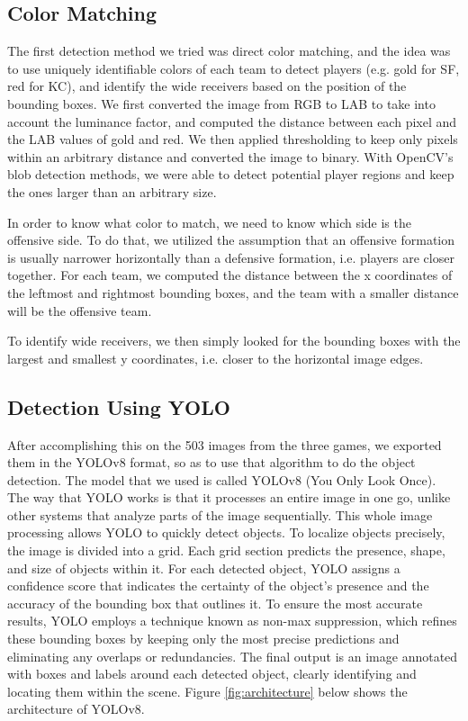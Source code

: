\subsection{Color Matching}
The first detection method we tried was direct color matching, and the idea was to use uniquely identifiable colors of each team to detect players (e.g. gold for SF, red for KC), and identify the wide receivers based on the position of the bounding boxes. We first converted the image from RGB to LAB to take into account the luminance factor, and computed the distance between each pixel and the LAB values of gold and red. We then applied thresholding to keep only pixels within an arbitrary distance and converted the image to binary. With OpenCV's blob detection methods, we were able to detect potential player regions and keep the ones larger than an arbitrary size.

In order to know what color to match, we need to know which side is the offensive side. To do that, we utilized the assumption that an offensive formation is usually narrower horizontally than a defensive formation, i.e. players are closer together. For each team, we computed the distance between the x coordinates of the leftmost and rightmost bounding boxes, and the team with a smaller distance will be the offensive team.

To identify wide receivers, we then simply looked for the bounding boxes with the largest and smallest y coordinates, i.e. closer to the horizontal image edges. 

\subsection{Detection Using YOLO}
After accomplishing this on the 503 images from the three games, we exported them in the YOLOv8 format, so as to use that algorithm to do the object detection.
The model that we used is called YOLOv8 (You Only Look Once). The way that YOLO works is that it processes an entire image in one go, unlike other systems that analyze parts of the image sequentially. This whole image processing allows YOLO to quickly detect objects.
To localize objects precisely, the image is divided into a grid. Each grid section predicts the presence, shape, and size of objects within it. For each detected object, YOLO assigns a confidence score that indicates the certainty of the object’s presence and the accuracy of the bounding box that outlines it. To ensure the most accurate results, YOLO employs a technique known as non-max suppression, which refines these bounding boxes by keeping only the most precise predictions and eliminating any overlaps or redundancies. The final output is an image annotated with boxes and labels around each detected object, clearly identifying and locating them within the scene. Figure \ref{fig:architecture} below shows the architecture of YOLOv8.


